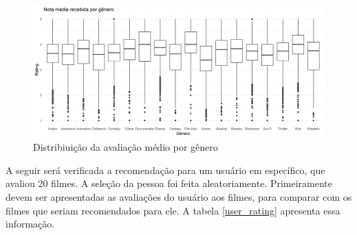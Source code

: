 \documentclass[12pt,a4paper,header]{abnt}
\begin{document}
\begin{figure}[h]
\centering
\includegraphics[scale = 0.6]{../R/img/rating_medio_genero.png}
\caption{Distribiuição da avaliação médio por gênero}
\label{genero_rating_medio}
\end{figure}

A seguir será verificada a recomendação para um usuário em específico, que avaliou 20 filmes. A seleção da pessoa foi feita aleatoriamente. Primeiramente devem ser apresentadas as avaliações do usuário aos filmes, para comparar com os filmes que seriam recomendados para ele. A tabela \ref{user_rating} apresenta essa informação.
\end{document}
